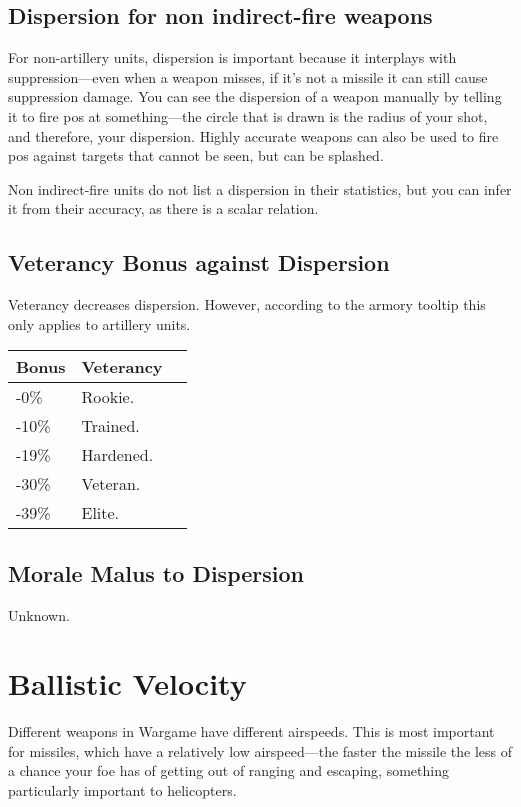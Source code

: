 \documentclass{article}
\begin{document}
\subsection{Dispersion for non indirect-fire weapons}
For non-artillery units, dispersion is important because it interplays with\\
suppression---even when a weapon misses, if it's not a missile it can still
cause suppression damage. You can see the dispersion of a weapon manually by
telling it to fire pos at something---the circle that is drawn is the radius of
your shot, and therefore, your dispersion. Highly accurate weapons can also be
used to fire pos against targets that cannot be seen, but can be splashed.

Non indirect-fire units do not list a dispersion in their statistics, but you
can infer it from their accuracy, as there is a scalar relation.

\subsection{Veterancy Bonus against Dispersion}

Veterancy decreases dispersion. However, according to the armory tooltip this
only applies to artillery units.

\begin{center}
    \begin{tabular}{ | l | l | l |}
    \hline
    Bonus & Veterancy \\ \hline
    -0\%  &  Rookie. \\
    -10\% & Trained. \\
    -19\% & Hardened. \\
    -30\% & Veteran. \\
    -39\% & Elite. \\
    \hline
    \end{tabular}
\end{center}

\subsection{Morale Malus to Dispersion}

Unknown.

\section{Ballistic Velocity}

Different weapons in Wargame have different airspeeds. This is most important
for missiles, which have a relatively low airspeed---the faster the missile the
less of a chance your foe has of getting out of ranging and escaping, something
particularly important to helicopters.
\end{document}

